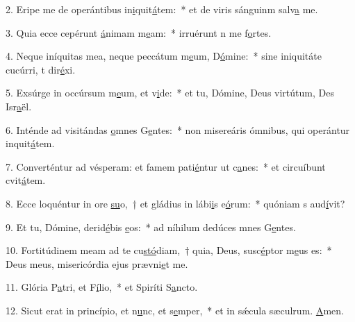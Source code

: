 2. Eripe me de operántibus in\uline{i}quit\uline{á}tem:~* et de viris sánguinm salv\uline{a} me.\par 
3. Quia ecce cepérunt \uline{á}nimam m\uline{e}am:~* irruérunt n me f\uline{o}rtes.\par 
4. Neque iníquitas mea, neque peccátum m\uline{e}um, D\uline{ó}mine:~* sine iniquitáte cucúrri, t dir\uline{é}xi.\par 
5. Exsúrge in occúrsum m\uline{e}um, et v\uline{i}de:~* et tu, Dómine, Deus virtútum, Des Isr\uline{a}ël.\par 
6. Inténde ad visitándas \uline{o}mnes G\uline{e}ntes:~* non misereáris ómnibus, qui operántur inquit\uline{á}tem.\par 
7. Converténtur ad vésperam: et famem pati\uline{é}ntur ut c\uline{a}nes:~* et circuíbunt cvit\uline{á}tem.\par 
8. Ecce loquéntur in ore \uline{su}o,~† et gládius in lábi\uline{i}s e\uline{ó}rum:~* quóniam s aud\uline{í}vit?\par 
9. Et tu, Dómine, derid\uline{é}bis \uline{e}os:~* ad níhilum dedúces mnes G\uline{e}ntes.\par 
10. Fortitúdinem meam ad te cu\uline{stó}diam,~† quia, Deus, susc\uline{é}ptor m\uline{e}us es:~* Deus meus, misericórdia ejus prævni\uline{e}t me.\par 
11. Glória P\uline{a}tri, et F\uline{í}lio,~* et Spiríti S\uline{a}ncto.\par 
12. Sicut erat in princípio, et n\uline{u}nc, et s\uline{e}mper,~* et in sǽcula sæculrum. \uline{A}men.\par 
